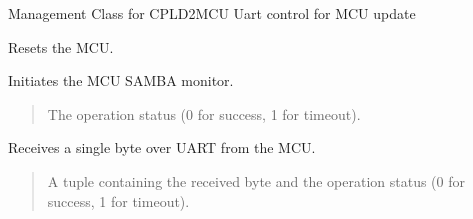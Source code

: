 \documentclass[letterpaper,10pt,english]{sphinxmanual}
\begin{document}
\begin{fulllineitems}
\label{\detokenize{cplddocs:management_mcu_uart.MngMcuUart}}
\pysigstartsignatures
{}
\pysigstopsignatures
\sphinxAtStartPar
Management Class for CPLD2MCU Uart control for MCU update

\begin{fulllineitems}
\label{\detokenize{cplddocs:management_mcu_uart.MngMcuUart.reset_mcu}}
\pysigstartsignatures
{}
\pysigstopsignatures
\sphinxAtStartPar
Resets the MCU.

\end{fulllineitems}


\begin{fulllineitems}
\label{\detokenize{cplddocs:management_mcu_uart.MngMcuUart.start_mcu_sam_ba_monitor}}
\pysigstartsignatures
{}
\pysigstopsignatures
\sphinxAtStartPar
Initiates the MCU SAM\sphinxhyphen{}BA monitor.
\begin{quote}\begin{description}
\sphinxAtStartPar
The operation status (0 for success, 1 for timeout).

\end{description}\end{quote}

\end{fulllineitems}


\begin{fulllineitems}
\label{\detokenize{cplddocs:management_mcu_uart.MngMcuUart.uart_receive_byte}}
\pysigstartsignatures
{}
\pysigstopsignatures
\sphinxAtStartPar
Receives a single byte over UART from the MCU.
\begin{quote}\begin{description}
\sphinxAtStartPar
A tuple containing the received byte and the operation status
(0 for success, 1 for timeout).


\end{description}
\end{quote}
\end{fulllineitems}
\end{fulllineitems}
\end{document}
